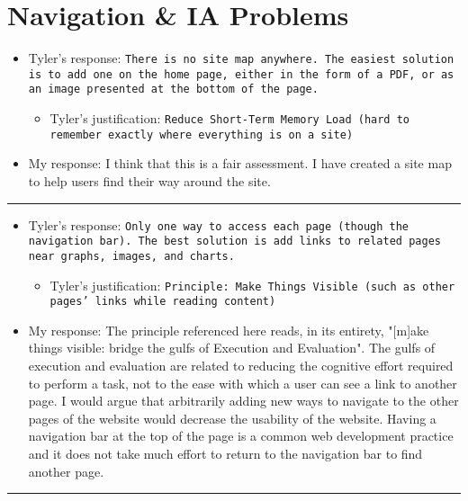 \documentclass{article}
\begin{document}
\section{Navigation \& IA Problems}
\begin{itemize}
	\item Tyler's response: \texttt{There is no site map anywhere.  The easiest solution is to add one on the home page, either in the form of a PDF, or as an image presented at the bottom of the page.}
	\begin{itemize}
		\item Tyler's justification: \texttt{Reduce Short-Term Memory Load (hard to remember exactly where everything is on a site)}
	\end{itemize}
	\item My response: I think that this is a fair assessment.  I have created a site map to help users find their way around the site.
\end{itemize}
\noindent\rule{3cm}{0.4pt}
\begin{itemize}
	\item Tyler's response: \texttt{Only one way to access each page (though the navigation bar).  The best solution is add links to related pages near graphs, images, and charts.}
	\begin{itemize}
		\item Tyler's justification: \texttt{Principle: Make Things Visible (such as other pages’ links while reading content)}
	\end{itemize}
	\item My response: The principle referenced here reads, in its entirety, "[m]ake things visible: bridge the gulfs of Execution and Evaluation".  The gulfs of execution and evaluation are related to reducing the cognitive effort required to perform a task, not to the ease with which a user can see a link to another page.  I would argue that arbitrarily adding new ways to navigate to the other pages of the website would decrease the usability of the website.  Having a navigation bar at the top of the page is a common web development practice and it does not take much effort to return to the navigation bar to find another page.
	
\end{itemize}
\noindent\rule{3cm}{0.4pt}
\end{document}
